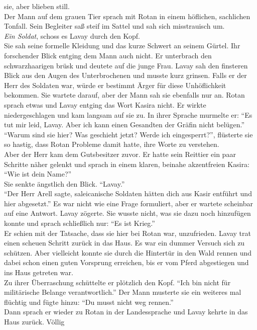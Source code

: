 sie, aber blieben still.\\
Der Mann auf dem grauen Tier sprach mit Rotan in einem höflichen, sachlichen Tonfall. Sein 
Begleiter saß steif im Sattel und sah sich misstrauisch um.\\
\textit{Ein Soldat}, schoss es Lavay durch den Kopf.\\
Sie sah seine formelle Kleidung und das kurze Schwert an seinem Gürtel. Ihr forschender Blick 
entging dem Mann auch nicht. Er unterbrach den schwarzhaarigen brüsk und deutete auf die junge 
Frau. Lavay sah den finsteren Blick aus den Augen des Unterbrochenen und musste kurz grinsen. Falls 
er der Herr des Soldaten war, würde er bestimmt Ärger für diese Unhöflichkeit bekommen. Sie wartete 
darauf, aber der Mann sah sie ebenfalls nur an. Rotan sprach etwas und Lavay entging das Wort 
Kasira nicht. Er wirkte niedergeschlagen und kam langsam auf sie zu. In ihrer Sprache murmelte er: 
``Es tut mir leid, Lavay. Aber ich kann einen Gesandten der Gräfin nicht belügen.''\\
``Warum sind sie hier? Was geschieht jetzt? Werde ich eingesperrt?'', flüsterte sie so hastig, dass 
Rotan Probleme damit hatte, ihre Worte zu verstehen.\\
Aber der Herr kam dem Gutsbesitzer zuvor. Er hatte sein Reittier ein paar Schritte näher gelenkt 
und sprach in einem klaren, beinahe akzentfreien Kasira: ``Wie ist dein Name?''\\
Sie senkte ängstlich den Blick. ``Lavay.''\\
``Der Herr Arell sagte, saleicanische Soldaten hätten dich aus Kasir entführt und hier abgesetzt.''
Es war nicht wie eine Frage formuliert, aber er wartete scheinbar auf eine Antwort. Lavay zögerte. 
Sie wusste nicht, was sie dazu noch hinzufügen konnte und sprach schließlich nur: ``Es ist 
Krieg.''\\
Er schien mit der Tatsache, dass sie hier bei Rotan war, unzufrieden. Lavay trat einen scheuen 
Schritt zurück in das Haus. Es war ein dummer Versuch sich zu schützen. Aber vielleicht konnte sie 
durch die Hintertür in den Wald rennen und dabei schon einen guten Vorsprung erreichen, bis er vom 
Pferd abgestiegen und ins Haus getreten war.\\
Zu ihrer Überraschung schüttelte er plötzlich den Kopf. ``Ich bin nicht für militärische Belange 
verantwortlich.'' Der Mann musterte sie ein weiteres mal flüchtig und fügte hinzu: ``Du musst nicht 
weg rennen.''\\
Dann sprach er wieder zu Rotan in der Landessprache und Lavay kehrte in das Haus zurück. Völlig 
